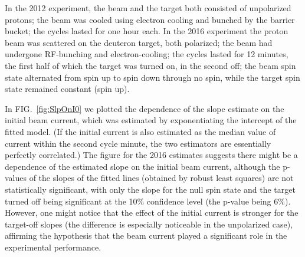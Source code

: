 \documentclass[reprint]{revtex4-1}
\begin{document}
In the 2012 experiment, the beam and the target both consisted of unpolarized protons; the beam was cooled using electron cooling and bunched by the barrier bucket; the cycles lasted for one hour each. In the 2016 experiment the proton beam was scattered on the deuteron target, both polarized; the beam had undergone RF-bunching and electron-cooling; the cycles lasted for 12 minutes, the first half of which the target was turned on, in the second off; the beam spin state alternated from spin up to spin down through no spin, while the target spin state remained constant (spin up). 

In FIG.~\ref{fig:SlpOnI0} we plotted the dependence of the slope estimate on the initial beam current, which was estimated by exponentiating the intercept of the fitted model. (If the initial current is also estimated as the median value of current within the second cycle minute, the two estimators are essentially perfectly correlated.) The figure for the 2016 estimates suggests there might be a dependence of the estimated slope on the initial beam current, although the p-values of the slopes of the fitted lines (obtained by robust least squares) are not statistically significant, with only the slope for the null spin state and the target turned off being significant at the 10\% confidence level (the p-value being 6\%). However, one might notice that the effect of the initial current is stronger for the target-off slopes (the difference is especially noticeable in the unpolarized case), affirming the hypothesis that the beam current played a significant role in the experimental performance.
\end{document}

